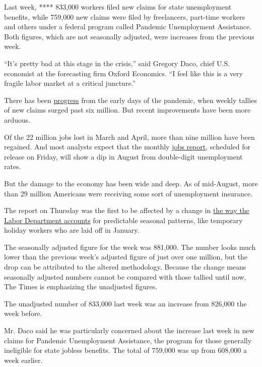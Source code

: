 Last week, **** 833,000 workers filed new claims for state unemployment
benefits, while 759,000 new claims were filed by freelancers, part-time
workers and others under a federal program called Pandemic Unemployment
Assistance. Both figures, which are not seasonally adjusted, were
increases from the previous week.

``It's pretty bad at this stage in the crisis,'' said Gregory Daco,
chief U.S. economist at the forecasting firm Oxford Economics. ``I feel
like this is a very fragile labor market at a critical juncture.''

There has been \href{https://fred.stlouisfed.org/series/ICNSA}{progress}
from the early days of the pandemic, when weekly tallies of new claims
surged past six million. But recent improvements have been more arduous.

Of the 22 million jobs lost in March and April, more than nine million
have been regained. And most analysts expect that the monthly
\href{https://www.bls.gov/}{jobs report}, scheduled for release on
Friday, will show a dip in August from double-digit unemployment rates.

But the damage to the economy has been wide and deep. As of mid-August,
more than 29 million Americans were receiving some sort of unemployment
insurance.

The report on Thursday was the first to be affected by a change in
\href{https://www.nytimes3xbfgragh.onion/live/2020/09/01/business/stock-market-today-coronavirus\#the-labor-department-will-start-counting-unemployment-claims-in-a-new-way}{the
way the Labor Department accounts} for predictable seasonal patterns,
like temporary holiday workers who are laid off in January.

The seasonally adjusted figure for the week was 881,000. The number
looks much lower than the previous week's adjusted figure of just over
one million, but the drop can be attributed to the altered methodology.
Because the change means seasonally adjusted numbers cannot be compared
with those tallied until now, The Times is emphasizing the unadjusted
figures.

The unadjusted number of 833,000 last week was an increase from 826,000
the week before.

Mr. Daco said he was particularly concerned about the increase last week
in new claims for Pandemic Unemployment Assistance, the program for
those generally ineligible for state jobless benefits. The total of
759,000 was up from 608,000 a week earlier.

